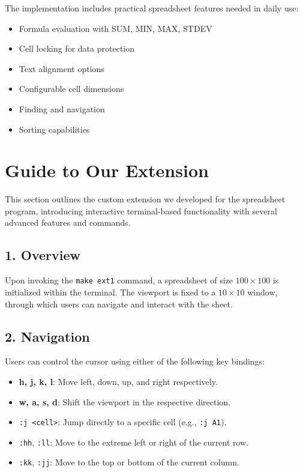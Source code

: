 \documentclass[a4paper,12pt]{article}
\begin{document}
\begin{itemize}[label={}]
    The implementation includes practical spreadsheet features needed in daily use:
\begin{itemize}
    \item Formula evaluation with SUM, MIN, MAX, STDEV
\item Cell locking for data protection
\item Text alignment options
\item Configurable cell dimensions
\item Finding and navigation
\item Sorting capabilities
\end{itemize}
    
    
\end{itemize}
\section{Guide to Our Extension}

This section outlines the custom extension we developed for the spreadsheet program, introducing interactive terminal-based functionality with several advanced features and commands.

\subsection*{1. Overview}

Upon invoking the \texttt{make ext1} command, a spreadsheet of size $100 \times 100$ is initialized within the terminal. The viewport is fixed to a $10 \times 10$ window, through which users can navigate and interact with the sheet.

\subsection*{2. Navigation}

Users can control the cursor using either of the following key bindings:
\begin{itemize}[label={}]
  \item \textbf{h, j, k, l}: Move left, down, up, and right respectively.
  \item \textbf{w, a, s, d}: Shift the viewport in the respective direction.
  \item \texttt{:j <cell>}: Jump directly to a specific cell (e.g., \texttt{:j A1}).
  \item \texttt{:hh}, \texttt{:ll}: Move to the extreme left or right of the current row.
  \item \texttt{:kk}, \texttt{:jj}: Move to the top or bottom of the current column.
\end{itemize}
\end{document}
